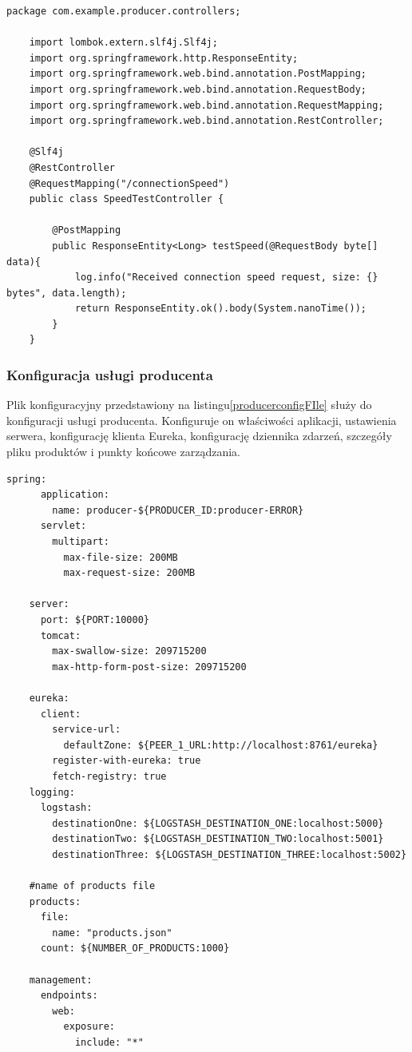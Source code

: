 \begin{lstlisting}[caption=Kod klasy SpeedTestController, label=speedTestControllerCode]
    package com.example.producer.controllers;

    import lombok.extern.slf4j.Slf4j;
    import org.springframework.http.ResponseEntity;
    import org.springframework.web.bind.annotation.PostMapping;
    import org.springframework.web.bind.annotation.RequestBody;
    import org.springframework.web.bind.annotation.RequestMapping;
    import org.springframework.web.bind.annotation.RestController;
    
    @Slf4j
    @RestController
    @RequestMapping("/connectionSpeed")
    public class SpeedTestController {
    
        @PostMapping
        public ResponseEntity<Long> testSpeed(@RequestBody byte[] data){
            log.info("Received connection speed request, size: {} bytes", data.length);
            return ResponseEntity.ok().body(System.nanoTime());
        }
    }
\end{lstlisting}

\subsubsection{Konfiguracja usługi producenta}

Plik konfiguracyjny przedstawiony na listingu\ref{producerconfigFIle} służy do konfiguracji usługi producenta. Konfiguruje on właściwości aplikacji, ustawienia serwera, konfigurację klienta Eureka, konfigurację dziennika zdarzeń, szczegóły pliku produktów i punkty końcowe zarządzania.

\begin{lstlisting}[caption=Plik konfiguracyjny usługi producenta, label=producerconfigFIle]
    spring:
      application:
        name: producer-${PRODUCER_ID:producer-ERROR}
      servlet:
        multipart:
          max-file-size: 200MB
          max-request-size: 200MB
    
    server:
      port: ${PORT:10000}
      tomcat:
        max-swallow-size: 209715200
        max-http-form-post-size: 209715200
    
    eureka:
      client:
        service-url:
          defaultZone: ${PEER_1_URL:http://localhost:8761/eureka}
        register-with-eureka: true
        fetch-registry: true
    logging:
      logstash:
        destinationOne: ${LOGSTASH_DESTINATION_ONE:localhost:5000}
        destinationTwo: ${LOGSTASH_DESTINATION_TWO:localhost:5001}
        destinationThree: ${LOGSTASH_DESTINATION_THREE:localhost:5002}
    
    #name of products file
    products:
      file:
        name: "products.json"
      count: ${NUMBER_OF_PRODUCTS:1000}
    
    management:
      endpoints:
        web:
          exposure:
            include: "*"
\end{lstlisting}

